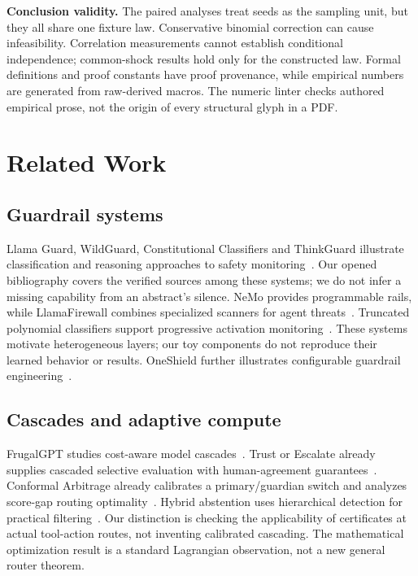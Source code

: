 \documentclass[lettersize,journal]{IEEEtran}
\begin{document}
\textbf{Conclusion validity.} The paired analyses treat seeds as the sampling
unit, but they all share one fixture law. Conservative binomial correction can
cause infeasibility. Correlation measurements cannot establish conditional
independence; common-shock results hold only for the constructed law. Formal
definitions and proof constants have proof provenance, while empirical numbers
are generated from raw-derived macros. The numeric linter checks authored
empirical prose, not the origin of every structural glyph in a PDF.

\section{Related Work}
\label{sec:related}
\subsection{Guardrail systems}
Llama Guard, WildGuard, Constitutional Classifiers and ThinkGuard
illustrate classification and reasoning approaches to safety
monitoring~\cite{arxiv231206674,arxiv240618495,arxiv250118837,arxiv250213458}.
Our opened bibliography covers the verified sources among these systems;
we do not infer a missing capability from an abstract's silence.
NeMo provides programmable rails, while LlamaFirewall combines specialized
scanners for agent threats~\cite{arxiv231010501,arxiv250503574}.
Truncated polynomial classifiers support progressive activation
monitoring~\cite{arxiv250926238}. These systems motivate heterogeneous layers;
our toy components do not reproduce their learned behavior or results.
OneShield further illustrates configurable guardrail
engineering~\cite{arxiv250721170}.

\subsection{Cascades and adaptive compute}
FrugalGPT studies cost-aware model cascades~\cite{arxiv230505176}.
Trust or Escalate already supplies cascaded selective evaluation with
human-agreement guarantees~\cite{arxiv240718370}. Conformal Arbitrage already
calibrates a primary/guardian switch and analyzes score-gap routing
optimality~\cite{arxiv250600911}. Hybrid abstention uses hierarchical detection
for practical filtering~\cite{arxiv260215391}. Our distinction is checking
the applicability of certificates at actual tool-action routes, not inventing
calibrated cascading. The mathematical optimization result is a standard
Lagrangian observation, not a new general router theorem.
\end{document}
